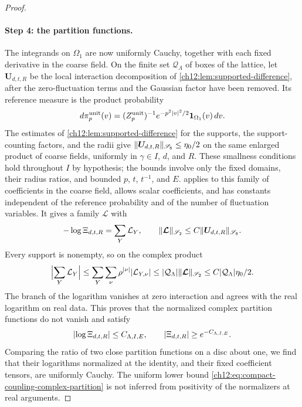 \begin{proof}
\paragraph{Step 4: the partition functions.}
The integrands on $\Omega_1$ are now uniformly Cauchy, together with each fixed derivative in the coarse field. On the finite set $\mathcal Q_\Lambda$ of boxes of the lattice, let $\boldsymbol U_{d,t,R}$ be the local interaction decomposition of \cref{ch12:lem:supported-difference}, after the zero-fluctuation terms and the Gaussian factor have been removed. Its reference measure is the product probability
\[
 d\pi_p^{\mathrm{unit}}(v)=(Z_p^{\mathrm{unit}})^{-1}e^{-p^2\lvert v\rvert^2/2}\mathbf 1_{\Omega_1}(v)\,dv .
\]
The estimates of \cref{ch12:lem:supported-difference} for the supports, the support-counting factors, and the radii give $\lVert \boldsymbol U_{d,t,R}\rVert_{\mathscr S_8}\le\eta_0/2$ on the same enlarged product of coarse fields, uniformly in $\gamma\in I$, $d$, and $R$. These smallness conditions hold throughout $I$ by hypothesis; the bounds involve only the fixed domains, their radius ratios, and bounded $p$, $t$, $t^{-1}$, and $E$.  applies to this family of coefficients in the coarse field, allows scalar coefficients, and has constants independent of the reference probability and of the number of fluctuation variables. It gives a family $\boldsymbol{\mathcal L}$ with
\[
 -\log\Xi_{d,t,R}=\sum_Y\mathcal L_Y,\qquad
 \lVert \boldsymbol{\mathcal L}\rVert_{\mathscr S_2}\le C\lVert \boldsymbol U_{d,t,R}\rVert_{\mathscr S_8}.
\]
Every support is nonempty, so on the complex product
\[
 \Bigl\lvert\sum_Y\mathcal L_Y\Bigr\rvert\le\sum_Y\sum_\nu\rho^{\lvert \nu\rvert}\lvert \mathcal L_{Y,\nu}\rvert\le\lvert \mathcal Q_\Lambda\rvert\lVert \boldsymbol{\mathcal L}\rVert_{\mathscr S_2}\le C\lvert \mathcal Q_\Lambda\rvert\eta_0/2 .
\]
The branch of the logarithm vanishes at zero interaction and agrees with the real logarithm on real data. This proves that the normalized complex partition functions do not vanish and satisfy
\begin{equation}\label{ch12:eq:compact-coupling-complex-partition}
 \lvert \log\Xi_{d,t,R}\rvert\le C_{\Lambda,I,E},\qquad \lvert \Xi_{d,t,R}\rvert\ge e^{-C_{\Lambda,I,E}} .
\end{equation}
Comparing the ratio of two close partition functions on a disc about one, we find that their logarithms normalized at the identity, and their fixed coefficient tensors, are uniformly Cauchy. The uniform lower bound \eqref{ch12:eq:compact-coupling-complex-partition} is not inferred from positivity of the normalizers at real arguments.


\end{proof}
